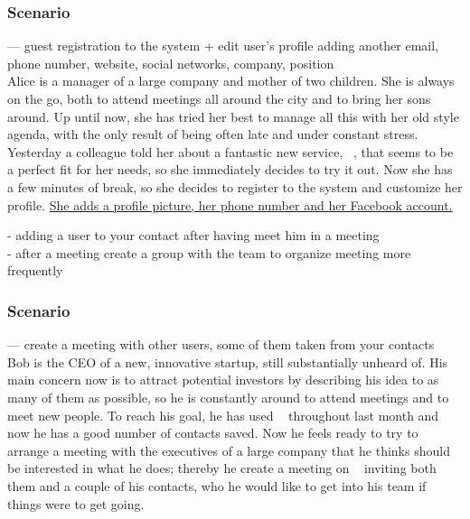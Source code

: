 
\subsubsection{Scenario \thecountScenarios }
--- guest registration  to the system + edit user's profile adding another email, phone number, website, social networks, company, position \\

Alice is a manager of a large company and mother of two children. She is always on the go, both to attend meetings all around the city and to bring her sons around. Up until now, she has tried her best to manage all this with her old style agenda, with the only result of being often late and under constant stress. Yesterday a colleague told her about a fantastic new service, \projectname~, that seems to be a perfect fit for her needs, so she immediately decides to try it out. Now she has a few minutes of break, so she decides to register to the system and customize her profile. \underline{She adds a profile picture, her phone number and her Facebook account.}

- adding a user to your contact after having meet him in a meeting \\
- after a meeting create a group with the team to organize meeting more frequently \\


\subsubsection{Scenario \thecountScenarios }
--- create a meeting with other users, some of them taken from your contacts\\

Bob is the CEO of a new, innovative startup, still substantially unheard of. His main concern now is to attract potential investors by describing his idea to as many of them as possible, so he is constantly around to attend meetings and to meet new people. To reach his goal, he has used \projectname~ throughout last month and now he has a good number of contacts saved. Now he feels ready to try to arrange a meeting with the executives of a large company that he thinks should be interested in what he does; thereby he create a meeting on \projectname~ inviting both them and a couple of his contacts, who he would like to get into his team if things were to get going.

